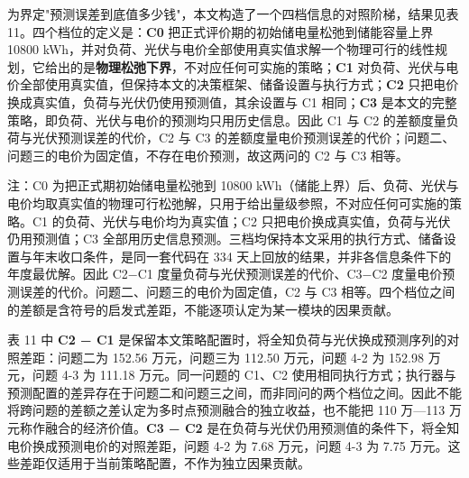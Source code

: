 \documentclass[12pt,a4paper]{ctexart}
\begin{document}
为界定"预测误差到底值多少钱"，本文构造了一个四档信息的对照阶梯，结果见表 11。四个档位的定义是：\textbf{C0} 把正式评价期的初始储电量松弛到储能容量上界 10800 kWh，并对负荷、光伏与电价全部使用真实值求解一个物理可行的线性规划，它给出的是\textbf{物理松弛下界}，不对应任何可实施的策略；\textbf{C1} 对负荷、光伏与电价全部使用真实值，但保持本文的决策框架、储备设置与执行方式；\textbf{C2} 只把电价换成真实值，负荷与光伏仍使用预测值，其余设置与 C1 相同；\textbf{C3} 是本文的完整策略，即负荷、光伏与电价的预测均只用历史信息。因此 C1 与 C2 的差额度量负荷与光伏预测误差的代价，C2 与 C3 的差额度量电价预测误差的代价；问题二、问题三的电价为固定值，不存在电价预测，故这两问的 C2 与 C3 相等。

\begin{table}[H]
\centering
\caption*{表11 全知对照阶梯：正式评价期 334 天四个档位的总费用（万元）}
\par\vspace{2pt}\footnotesize 注：C0 为把正式期初始储电量松弛到 10800 kWh（储能上界）后、负荷、光伏与电价均取真实值的物理可行松弛解，只用于给出量级参照，不对应任何可实施的策略。C1 的负荷、光伏与电价均为真实值；C2 只把电价换成真实值，负荷与光伏仍用预测值；C3 全部用历史信息预测。三档均保持本文采用的执行方式、储备设置与年末收口条件，是同一套代码在 334 天上回放的结果，并非各信息条件下的年度最优解。因此 C2−C1 度量负荷与光伏预测误差的代价、C3−C2 度量电价预测误差的代价。问题二、问题三的电价为固定值，C2 与 C3 相等。四个档位之间的差额是含符号的启发式差距，不能逐项认定为某一模块的因果贡献。
\end{table}

表 11 中 \textbf{C2 − C1} 是保留本文策略配置时，将全知负荷与光伏换成预测序列的对照差距：问题二为 152.56 万元，问题三为 112.50 万元，问题 4-2 为 152.98 万元，问题 4-3 为 111.18 万元。同一问题的 C1、C2 使用相同执行方式；执行器与预测配置的差异存在于问题二和问题三之间，而非同问的两个档位之间。因此不能将跨问题的差额之差认定为多时点预测融合的独立收益，也不能把 110 万—113 万元称作融合的经济价值。\textbf{C3 − C2} 是在负荷与光伏仍用预测值的条件下，将全知电价换成预测电价的对照差距，问题 4-2 为 7.68 万元，问题 4-3 为 7.75 万元。这些差距仅适用于当前策略配置，不作为独立因果贡献。
\end{document}
